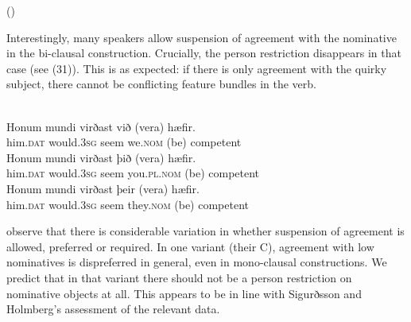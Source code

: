 \documentclass[output=paper]{langsci/langscibook}
\begin{document}
\ea \label{bkm:Ref295483138} 
\ea (\citealt{Sigurðsson2008})\\
\z
\z

Interestingly, many speakers allow suspension of agreement with the nominative in the bi-clausal construction. Crucially, the person restriction disappears in that case (see (31)). This is as expected: if there is only agreement with the quirky subject, there cannot be conflicting feature bundles in the verb.

\ea \label{bkm:Ref295483205} \citep{Sigurðsson2008}\\
 \ea \gll  Honum  mundi        virðast við         (vera) hæfir.\\
 him.\textsc{dat} would.\textsc{3sg} seem    we.\textsc{nom} (be)    competent   \\
  \ex \gll  Honum  mundi       virðast þið               (vera) hæfir.\\
  him.\textsc{dat} would.\textsc{3sg} seem   you.\textsc{pl.nom} (be)    competent\\
  \ex \gll  Honum  mundi       virðast þeir          (vera) hæfir.\\
  him.\textsc{dat} would.\textsc{3sg} seem   they.\textsc{nom} (be)    competent\\
\z
\z

\citet{Sigurðsson2008} observe that there is considerable variation in whether suspension of agreement is allowed, preferred or required. In one variant (their  C), agreement with low nominatives is dispreferred in general, even in mono-clausal constructions. We predict that in that variant there should not be a person restriction on nominative objects at all. This appears to be in line with Sigurðsson and Holmberg’s assessment of the relevant data.
\end{document}

